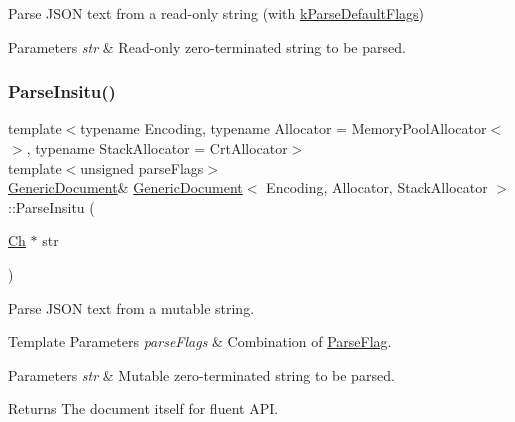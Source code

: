 Parse J\+S\+ON text from a read-\/only string (with \hyperlink{reader_8h_ab7be7dabe6ffcba60fad441505583450a9104b0946d648e9467cb7a967401ec80}{k\+Parse\+Default\+Flags}) 


\begin{DoxyParams}{Parameters}
{\em str} & Read-\/only zero-\/terminated string to be parsed. \\
\hline
\end{DoxyParams}
\mbox{\label{class_generic_document_a301f8f297a5a0da4b6be5459ad766f75}} 
\subsubsection{\texorpdfstring{Parse\+Insitu()}{ParseInsitu()}\hspace{0.1cm}{\footnotesize\ttfamily [1/2]}}
{\footnotesize\ttfamily template$<$typename Encoding, typename Allocator = Memory\+Pool\+Allocator$<$$>$, typename Stack\+Allocator = Crt\+Allocator$>$ \\
template$<$unsigned parse\+Flags$>$ \\
\hyperlink{class_generic_document}{Generic\+Document}\& \hyperlink{class_generic_document}{Generic\+Document}$<$ Encoding, Allocator, Stack\+Allocator $>$\+::Parse\+Insitu (\begin{DoxyParamCaption}\item[{\hyperlink{class_generic_value_ade0e0ce64ccd5d852da57a35e720bafb}{Ch} $\ast$}]{str }\end{DoxyParamCaption})\hspace{0.3cm}{\ttfamily [inline]}}



Parse J\+S\+ON text from a mutable string. 


\begin{DoxyTemplParams}{Template Parameters}
{\em parse\+Flags} & Combination of \hyperlink{reader_8h_ab7be7dabe6ffcba60fad441505583450}{Parse\+Flag}. \\
\hline
\end{DoxyTemplParams}

\begin{DoxyParams}{Parameters}
{\em str} & Mutable zero-\/terminated string to be parsed. \\
\hline
\end{DoxyParams}
\begin{DoxyReturn}{Returns}
The document itself for fluent A\+PI. 
\end{DoxyReturn}
\mbox{\label{class_generic_document_a81922881357539d5482d31aea14b5664}} 
